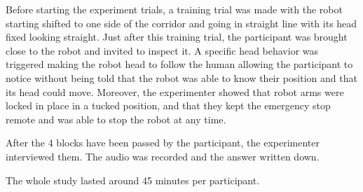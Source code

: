 \documentclass[a4paper,11pt,twoside]{StyleThese}
\begin{document}
Before starting the experiment trials, a training trial was made with the robot starting shifted to one side of the corridor and going in straight line with its head fixed looking straight. Just after this training trial, the participant was brought close to the robot and invited to inspect it. A specific head behavior was triggered making the robot head to follow the human allowing the participant to notice without being told that the robot was able to know their position and that its head could move. Moreover, the experimenter showed that robot arms were locked in place in a tucked position, and that they kept the emergency stop remote and was able to stop the robot at any time.

After the 4 blocks have been passed by the participant, the experimenter interviewed them. The audio was recorded and the answer written down.

The whole study lasted around 45 minutes per participant.
\end{document}
